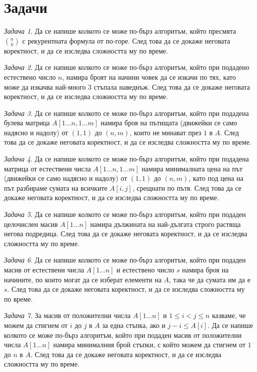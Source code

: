 \documentclass{article}
\theoremstyle{definition}
\theoremstyle{plain}
\theoremstyle{remark}
\newtheorem{problem}{Задача}
\theoremstyle{definition}
\begin{document}
\section*{Задачи}

\begin{problem}
Да се напише колкото се може по-бърз алгоритъм, който пресмята ${n \choose k}$ с рекурентната формула от по-горе.
След това да се докаже неговата коректност, и да се изследва сложността му по време.
\end{problem}

\begin{problem}
Да се напише колкото се може по-бърз алгоритъм, който при подадено естествено число $n$, намира броят на начини човек да се изкачи по тях, като може да изкачва най-много $3$ стъпала наведнъж.
След това да се докаже неговата коректност, и да се изследва сложността му по време.
\end{problem}

\begin{problem}
Да се напише колкото се може по-бърз алгоритъм, който при подадена булева матрица $A[1 \dots n, 1 \dots m]$ намира броя на пътищата (движейки се само надясно и надолу) от $(1, 1)$ до $(n, m)$, които не минават през $1$ в $A$.
След това да се докаже неговата коректност, и да се изследва сложността му по време.
\end{problem}

\begin{problem}
Да се напише колкото се може по-бърз алгоритъм, който при подадена матрица от естествени числа $A[1 \dots n, 1 \dots m]$ намира минималната цена на път (движейки се само надясно и надолу) от $(1, 1)$ до $(n, m)$, като под цена на път разбираме сумата на всичките $A[i, j]$, срещнати по пътя.
След това да се докаже неговата коректност, и да се изследва сложността му по време.
\end{problem}


\begin{problem}
Да се напише колкото се може по-бърз алгоритъм, който при подаден целочислен масив $A[1 \dots n]$ намира дължината на най-дългата строго растяща негова подредица.
След това да се докаже неговата коректност, и да се изследва сложността му по време.
\end{problem}

\begin{problem}
Да се напише колкото се може по-бърз алгоритъм, който при подаден масив от естествени числа $A[1 \dots n]$ и естествено число $s$ намира броя на начините, по които могат да се изберат елементи на $A$, така че да сумата им да е $s$.
След това да се докаже неговата коректност, и да се изследва сложността му по време.
\end{problem}

\begin{problem}
За масив от положителни числа $A[1 \dots n]$ и $1 \leq i < j \leq n$ казваме, че можем да стигнем от $i$ до $j$ в $A$ за една стъпка, ако и $j - i \leq A[i]$.
Да се напише колкото се може по-бърз алгоритъм, който при подаден масив от положителни числа $A[1 \dots n]$ намира минималния брой стъпки, с който можем да стигнем от $1$ до $n$ в $A$.
След това да се докаже неговата коректност, и да се изследва сложността му по време.
\end{problem}
\end{document}
